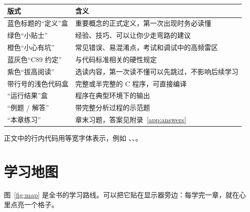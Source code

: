 \begin{center}
\begin{tabular}{@{}p{}p{}@{}}
\toprule
\textbf{版式} & \textbf{含义} \\
\midrule
蓝色标题的“定义”盒 & 重要概念的正式定义，第一次出现时务必读懂 \\
绿色“小贴士” & 经验、技巧、可以让你少走弯路的建议 \\
橙色“小心有坑” & 常见错误、易混淆点，考试和调试中的高频雷区 \\
蓝灰色“C89 约定” & 与代码标准相关的硬性规定 \\
紫色“拔高阅读” & 选读内容，第一次读不懂可以先跳过，不影响后续学习 \\
带行号的浅色代码盒 & 完整或半完整的 C 程序，可直接编译 \\
“运行结果”盒 & 程序在典型环境下的输出 \\
“例题 / 解答” & 带完整分析过程的示范题 \\
“本章练习” & 章末习题，答案见附录~\ref{app:answers} \\
\bottomrule
\end{tabular}
\end{center}

正文中的行内代码用等宽字体表示，例如 、、。

\section*{学习地图}

图~\ref{fig:map} 是全书的学习路线。可以把它贴在显示器旁边：每学完一章，就在心里点亮一个格子。


